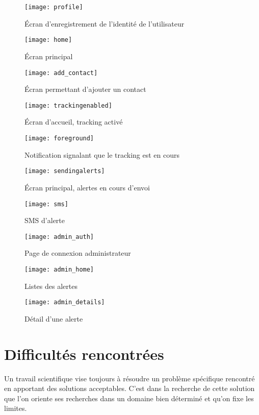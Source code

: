 \begin{figure}[H]
	\centering
	\texttt{[image: profile]}
	\caption{Écran d’enregistrement de l’identité de l’utilisateur}
\end{figure}

\begin{figure}[H]
	\centering
	\texttt{[image: home]}
	\caption{Écran principal}
\end{figure}

\begin{figure}[H]
	\centering
	\texttt{[image: add\_contact]}
	\caption{Écran permettant d’ajouter un contact}
\end{figure}

\begin{figure}[H]
	\centering
	\texttt{[image: trackingenabled]}
	\caption{Écran d'accueil, tracking activé}
\end{figure}

\begin{figure}[H]
	\centering
	\texttt{[image: foreground]}
	\caption{Notification signalant que le tracking est en cours}
\end{figure}

\begin{figure}[H]
	\centering
	\texttt{[image: sendingalerts]}
	\caption{Écran principal, alertes en cours d’envoi}
\end{figure}

\begin{figure}[H]
	\centering
	\texttt{[image: sms]}
	\caption{SMS d’alerte}
\end{figure}

\begin{figure}[H]
	\centering
	\texttt{[image: admin\_auth]}
	\caption{Page de connexion administrateur}
\end{figure}

\begin{figure}[H]
	\centering
	\texttt{[image: admin\_home]}
	\caption{Listes des alertes}
\end{figure}

\begin{figure}[H]
	\centering
	\texttt{[image: admin\_details]}
	\caption{Détail d’une alerte}
\end{figure}

\section{Difficultés rencontrées}
Un travail scientifique vise toujours à résoudre un problème spécifique rencontré en apportant des solutions acceptables. C’est dans la recherche de cette solution que l’on oriente ses recherches dans un domaine bien déterminé et qu’on fixe les limites.

